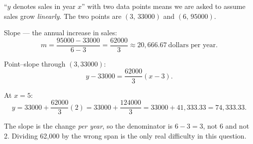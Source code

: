 \begin{solution}
``$y$ denotes sales in year $x$'' with two data points means we are asked to
assume sales grow \emph{linearly}. The two points are $(3,\,33000)$ and
$(6,\,95000)$.

\medskip
Slope --- the annual increase in sales:
\[
m=\frac{95000-33000}{6-3}=\frac{62000}{3}\approx 20{,}666.67
\ \text{dollars per year}.
\]

Point--slope through $(3,33000)$:
\[
y-33000=\frac{62000}{3}(x-3).
\]

At $x=5$:
\[
y=33000+\frac{62000}{3}(2)=33000+\frac{124000}{3}
=33000+41{,}333.33=74{,}333.33 .
\]


\end{solution}

\begin{pitfall}
The slope is the change \emph{per year}, so the denominator is $6-3=3$, not 6
and not 2. Dividing 62{,}000 by the wrong span is the only real difficulty in
this question.
\end{pitfall}
